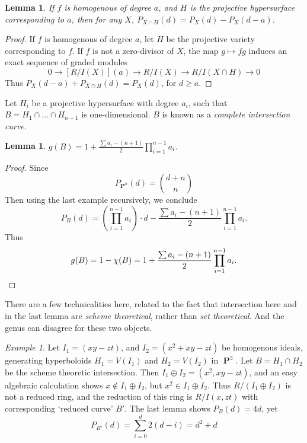 \documentclass{article}
\theoremstyle{plain}
\newtheorem{lemma}[theorem]{Lemma}
\theoremstyle{remark}
\newtheorem*{example}{Example}
\theoremstyle{definition}
\DeclareMathOperator{\PP}{\mathbf{P}}
\begin{document}
\begin{lemma}
    If $f$ is homogenous of degree $a$, and $H$ is the projective hypersurface corresponding to $a$, then for any $X$, $P_{X \cap H}(d) = P_X(d) - P_X(d-a)$.
\end{lemma}
\begin{proof}
    If $f$ is homogenous of degree $a$, let $H$ be the projective variety corresponding to $f$. If $f$ is not a zero-divisor of $X$, the map $g \mapsto fg$ induces an exact sequence of graded modules
    \[ 0 \to [R/I(X)](a) \to R/I(X) \to R/I(X \cap H) \to 0 \]
    Thus $P_X(d-a) + P_{X \cap H}(d) = P_X(d)$, for $d \geq a$.
\end{proof}

Let $H_i$ be a projective hypersurface with degree $a_i$, such that $B = H_1 \cap \dots \cap H_{n-1}$ is one-dimensional. $B$ is known as a {\it complete intersection curve}.

\begin{lemma}
    $g(B) = 1 + \frac{\sum a_i - (n + 1)}{2} \prod_{i = 1}^{n-1} a_i$.
\end{lemma}
\begin{proof}
     Since
    \[ P_{\PP^n}(d) = {{d+n} \choose {n}} \]
    Then using the last example recursively, we conclude
    \[ P_B(d) = \left( \prod_{i = 1}^{n-1} a_i \right) \cdot d - \frac{\sum a_i - (n + 1)}{2} \prod_{i = 1}^{n-1} a_i. \]
    Thus
    \[ g(B) = 1 - \chi(B) = 1 + \frac{\sum a_i - (n + 1)}{2} \prod_{i = 1}^{n-1} a_i. \qedhere \]
\end{proof}

There are a few technicalities here, related to the fact that intersection here and in the last lemma are {\it scheme theoretical}, rather than {\it set theoretical}. And the genus can disagree for these two objects.

\begin{example}
    Let $I_1 = (xy-zt)$, and $I_2 = (x^2 + xy - zt)$ be homogenous ideals, generating hyperboloids $H_1 = V(I_1)$ and $H_2 = V(I_2)$ in $\PP^3$. Let $B = H_1 \cap H_2$ be the scheme theoretic intersection. Then $I_1 \oplus I_2 = (x^2, xy - zt)$, and an easy algebraic calculation shows $x \not \in I_1 \oplus I_2$, but $x^2 \in I_1 \oplus I_2$. Thus $R/(I_1 \oplus I_2)$ is not a reduced ring, and the reduction of this ring is $R/I(x,zt)$ with corresponding `reduced curve' $B'$. The last lemma shows $P_B(d) = 4d$, yet
    \[ P_{B'}(d) = \sum_{i = 0}^d 2(d-i) = d^2 + d \]
\end{example}
\end{document}
